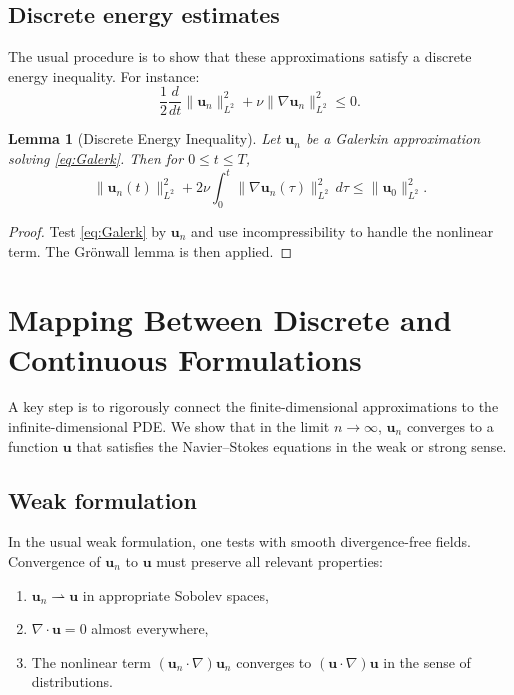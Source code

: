 \documentclass[11pt]{article}
\newtheorem{lemma}[theorem]{Lemma}
\numberwithin{equation}{section}
\begin{document}
\subsection{Discrete energy estimates}

The usual procedure is to show that these approximations satisfy a discrete
energy inequality. For instance:
\[
\frac{1}{2} \frac{d}{dt} \|\mathbf{u}_n\|_{L^2}^2
+ \nu \|\nabla \mathbf{u}_n\|_{L^2}^2 \le 0.
\]

\begin{lemma}[Discrete Energy Inequality]
Let \(\mathbf{u}_n\) be a Galerkin approximation solving \eqref{eq:Galerk}.
Then for \(0 \le t \le T\),
\[
\|\mathbf{u}_n(t)\|_{L^2}^2 + 2\nu
\int_0^t \|\nabla \mathbf{u}_n(\tau)\|_{L^2}^2 \, d\tau
\le \|\mathbf{u}_0\|_{L^2}^2.
\]
\end{lemma}

\begin{proof}
Test \eqref{eq:Galerk} by \(\mathbf{u}_n\) and use incompressibility to handle
the nonlinear term. The Grönwall lemma is then applied.
\end{proof}

\section{Mapping Between Discrete and Continuous Formulations}\label{sec:mapping}

A key step is to rigorously connect the finite-dimensional approximations to the
infinite-dimensional PDE. We show that in the limit \(n \to \infty\),
\(\mathbf{u}_n\) converges to a function \(\mathbf{u}\) that satisfies
the Navier--Stokes equations in the weak or strong sense.

\subsection{Weak formulation}

In the usual weak formulation, one tests with smooth divergence-free fields.
Convergence of \(\mathbf{u}_n\) to \(\mathbf{u}\) must preserve all relevant
properties:
\begin{enumerate}[label=(\roman*)]
\item \(\mathbf{u}_n \rightharpoonup \mathbf{u}\) in appropriate Sobolev spaces,
\item \(\nabla \cdot \mathbf{u} = 0\) almost everywhere,
\item The nonlinear term \((\mathbf{u}_n \cdot \nabla)\mathbf{u}_n\) converges
      to \((\mathbf{u}\cdot \nabla)\mathbf{u}\) in the sense of distributions.
\end{enumerate}
\end{document}
